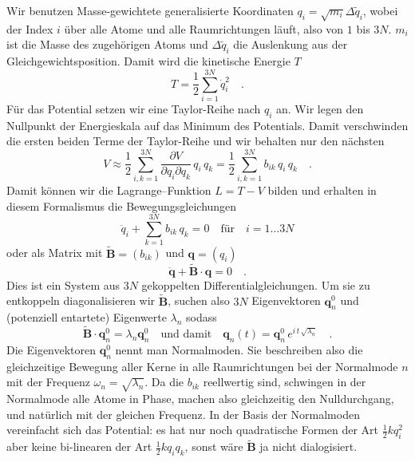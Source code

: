 Wir benutzen Masse-gewichtete generalisierte Koordinaten $q_i = \sqrt{m_i}  \Delta \tilde{q}_i$, wobei der Index $i$ über alle Atome und alle Raumrichtungen läuft, also von $1$ bis $3N$. $m_i$ ist die Masse des zugehörigen Atoms und 
$\Delta \tilde{q}_i$ die Auslenkung aus der Gleichgewichtsposition. Damit wird  die kinetische Energie $T$ 
\begin{equation}
T = \frac{1}{2} \sum_{i=1}^{3N} \dot{q}_i^2 \quad .
\end{equation}
Für das Potential setzen wir eine Taylor-Reihe nach $q_i$ an. Wir legen den Nullpunkt der Energieskala auf das Minimum des Potentials. Damit verschwinden die ersten beiden Terme der Taylor-Reihe und wir behalten nur den nächsten
\begin{equation}
V \approx \frac{1}{2} \sum_{i,k = 1}^{3N} \frac{\partial V}{\partial q_i \partial q_k} \, q_i \, q_k = 
 \frac{1}{2} \sum_{i,k = 1}^{3N} b_{ik} \, q_i \, q_k  \quad .
\end{equation}
Damit können wir die Lagrange--Funktion $L = T - V$ bilden und erhalten in diesem Formalismus die Bewegungsgleichungen
\begin{equation}
 \ddot{q}_i + \sum_{k = 1}^{3N} b_{ik} \, q_k = 0 \quad \text{für} \quad i = 1 \dots 3N
\end{equation}
oder als Matrix mit $\tilde{\mathbf{B}} = (b_{ik})$ und $\mathbf{q} = (q_i)$
\begin{equation}
\ddot{\mathbf{q}} + \tilde{\mathbf{B}}  \cdot  \mathbf{q} = 0 \quad .
\end{equation}
Dies ist ein System aus $3N$ gekoppelten Differentialgleichungen. Um sie zu entkoppeln diagonalisieren wir 
$\tilde{\mathbf{B}} $, suchen also $3N$ Eigenvektoren   $\mathbf{q}_n^0$ und (potenziell entartete) Eigenwerte $\lambda_n$ sodass
\begin{equation}
 \tilde{\mathbf{B}} \cdot \mathbf{q}_n^0 = \lambda_n \mathbf{q}_n^0 \quad \text{und damit} \quad
 \mathbf{q}_n(t) =  \mathbf{q}_n^0 \, e^{i \, t \, \sqrt{\lambda_n}} \quad .
\end{equation}
Die Eigenvektoren   $\mathbf{q}_n^0$ nennt man Normalmoden. Sie beschreiben also die gleichzeitige Bewegung aller Kerne in alle Raumrichtungen bei der Normal\-mode $n$ mit der Frequenz $\omega_n = \sqrt{\lambda_n}$. Da die $b_{ik}$ reellwertig sind, schwingen in der Normalmode alle Atome in Phase, machen also gleichzeitig den Nulldurchgang, und natürlich mit der gleichen Frequenz. In der Basis der Normalmoden vereinfacht sich das Potential: es hat nur noch quadratische Formen der Art $\frac{1}{2} k q_i^2$ aber keine bi-linearen der Art $\frac{1}{2} k q_i q_k$, sonst wäre $\tilde{\mathbf{B}} $ ja nicht dialogisiert.

